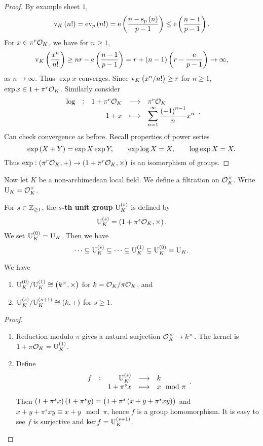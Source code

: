 \begin{proof}
By example sheet $ 1 $,
$$ \v_K\br{n!} = \e\v_p\br{n!} = \e\br{\dfrac{n - \s_p\br{n}}{p - 1}} \le \e\br{\dfrac{n - 1}{p - 1}}. $$
For $ x \in \pi^r\mathcal{O}_K $, we have for $ n \ge 1 $,
$$ \v_K\br{\dfrac{x^n}{n!}} \ge nr - \e\br{\dfrac{n - 1}{p - 1}} = r + \br{n - 1}\br{r - \dfrac{\e}{p - 1}} \to \infty, $$
as $ n \to \infty $. Thus $ \exp x $ converges. Since $ \v_K\br{x^n / n!} \ge r $ for $ n \ge 1 $, $ \exp x \in 1 + \pi^r\mathcal{O}_K $. Similarly consider
$$ \function[\log]{1 + \pi^r\OOO_K}{\pi^r\OOO_K}{1 + x}{\displaystyle\sum_{n = 1}^\infty \dfrac{\br{-1}^{n - 1}}{n}x^n}. $$
Can check convergence as before. Recall properties of power series
$$ \exp \br{X + Y} = \exp X\exp Y, \qquad \exp \log X = X, \qquad \log \exp X = X. $$
Thus $ \exp : \br{\pi^r\OOO_K, +} \to \br{1 + \pi^r\OOO_K, \times} $ is an isomorphism of groups.
\end{proof}

Now let $ K $ be a non-archimedean local field. We define a filtration on $ \mathcal{O}_K^\times $. Write $ \mathrm{U}_K = \mathcal{O}_K^\times $.

\begin{definition}
For $ s \in \mathbb{Z}_{\ge 1} $, the \textbf{$ s $-th unit group} $ \U_K^{\br{s}} $ is defined by
$$ \U_K^{\br{s}} = \br{1 + \pi^s\OOO_K, \times}. $$
We set $ \U_K^{\br{0}} = \U_K $. Then we have
$$ \dots \subseteq \U_K^{\br{s}} \subseteq \dots \subseteq \U_K^{\br{1}} \subseteq \U_K^{\br{0}} = \U_K. $$
\end{definition}

\begin{proposition}
\label{prop:15.3}
We have
\begin{enumerate}
\item $ \U_K^{\br{0}} / \U_K^{\br{1}} \cong \br{k^\times, \times} $ for $ k = \mathcal{O}_K / \pi\mathcal{O}_K $, and
\item $ \U_K^{\br{s}} / \U_K^{\br{s + 1}} \cong \br{k, +} $ for $ s \ge 1 $.
\end{enumerate}
\end{proposition}

\begin{proof}
\hfill
\begin{enumerate}
\item Reduction modulo $ \pi $ gives a natural surjection $ \mathcal{O}_K^\times \to k^\times $. The kernel is $ 1 + \pi\OOO_K = \U_K^{\br{1}} $.
\item Define
$$ \function[f]{\U_K^{\br{s}}}{k}{1 + \pi^sx}{x \mod \pi}. $$
Then $ \br{1 + \pi^sx}\br{1 + \pi^sy} = \br{1 + \pi^s\br{x + y + \pi^sxy}} $ and $ x + y + \pi^sxy \equiv x + y \mod \pi $, hence $ f $ is a group homomorphism. It is easy to see $ f $ is surjective and $ \ker f = \U_K^{\br{s + 1}} $.
\end{enumerate}
\end{proof}

